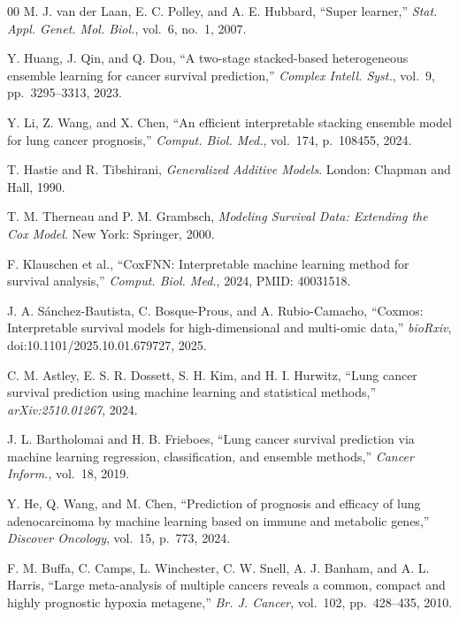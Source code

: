 \documentclass[conference]{IEEEtran}
\begin{document}
\begin{thebibliography}{00}
M. J. van der Laan, E. C. Polley, and A. E. Hubbard, ``Super learner,''
\textit{Stat. Appl. Genet. Mol. Biol.}, vol.~6, no.~1, 2007.

Y. Huang, J. Qin, and Q. Dou, ``A two-stage stacked-based heterogeneous
ensemble learning for cancer survival prediction,''
\textit{Complex Intell. Syst.}, vol.~9, pp.~3295--3313, 2023.

Y. Li, Z. Wang, and X. Chen, ``An efficient interpretable stacking ensemble
model for lung cancer prognosis,''
\textit{Comput. Biol. Med.}, vol.~174, p.~108455, 2024.

T. Hastie and R. Tibshirani,
\textit{Generalized Additive Models}. London: Chapman and Hall, 1990.

T. M. Therneau and P. M. Grambsch,
\textit{Modeling Survival Data: Extending the Cox Model}.
New York: Springer, 2000.

F. Klauschen et al., ``CoxFNN: Interpretable machine learning method for
survival analysis,'' \textit{Comput. Biol. Med.}, 2024, PMID: 40031518.

J. A. S\'{a}nchez-Bautista, C. Bosque-Prous, and A. Rubio-Camacho,
``Coxmos: Interpretable survival models for high-dimensional and
multi-omic data,'' \textit{bioRxiv}, doi:10.1101/2025.10.01.679727, 2025.

C. M. Astley, E. S. R. Dossett, S. H. Kim, and H. I. Hurwitz,
``Lung cancer survival prediction using machine learning and statistical
methods,'' \textit{arXiv:2510.01267}, 2024.

J. L. Bartholomai and H. B. Frieboes, ``Lung cancer survival prediction via
machine learning regression, classification, and ensemble methods,''
\textit{Cancer Inform.}, vol.~18, 2019.

Y. He, Q. Wang, and M. Chen, ``Prediction of prognosis and efficacy of
lung adenocarcinoma by machine learning based on immune and metabolic genes,''
\textit{Discover Oncology}, vol.~15, p.~773, 2024.

F. M. Buffa, C. Camps, L. Winchester, C. W. Snell, A. J. Banham, and A. L. Harris,
``Large meta-analysis of multiple cancers reveals a common, compact and
highly prognostic hypoxia metagene,''
\textit{Br. J. Cancer}, vol.~102, pp.~428--435, 2010.


\end{thebibliography}
\end{document}
